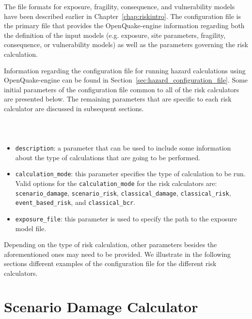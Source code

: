 The file formats for exposure, fragility, consequence, and vulnerability
models have been described earlier in Chapter~\ref{chap:riskintro}. The
configuration file is the primary file that provides the OpenQuake-engine
information regarding both the definition of the input models (e.g. exposure,
site parameters, fragility, consequence, or vulnerability models) as well as
the parameters governing the risk calculation.

Information regarding the configuration file for running hazard calculations
using OpenQuake-engine can be found in
Section~\ref{sec:hazard_configuration_file}. Some initial parameters of the
configuration file common to all of the risk calculators are presented below.
The remaining parameters that are specific to each risk calculator are
discussed in subsequent sections.

\inputminted[firstline=1,firstnumber=1,fontsize=\footnotesize,frame=single,linenos,bgcolor=lightgray]{ini}{oqum/risk/Verbatim/config_example.ini}\\

\begin{itemize}

  \item \Verb+description+: a parameter that can be used to include some
  information about the type of calculations that are going to be performed.

  \item \Verb+calculation_mode+: this parameter specifies the type of
  calculation to be run. Valid options for the \Verb+calculation_mode+ for
  the risk calculators are: \Verb+scenario_damage+, \Verb+scenario_risk+,
  \Verb+classical_damage+, \Verb+classical_risk+, \Verb+event_based_risk+,
  and \Verb+classical_bcr+.

  \item \Verb+exposure_file+: this parameter is used to specify the path to
  the \gls{exposure model} file.

\end{itemize}

Depending on the type of risk calculation, other parameters besides the
aforementioned ones may need to be provided. We illustrate in the following
sections different examples of the configuration file for the different risk
calculators.


\section{Scenario Damage Calculator}
\label{sec:config_scenario_damage}


